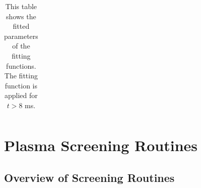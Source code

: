 \documentclass[
	11pt, %
]{beamer}
\begin{document}
\begin{frame}[allowframebreaks]
\begin{table}
{\begin{tabular}{ccccccc}
        \bottomrule
        \end{tabular}}
        \caption{\scriptsize This table shows the fitted parameters of the fitting functions. The fitting function is applied for $t > 8$ ms.}
    \end{table}

    \begin{table}
        \caption{This table shows the instantaneous flame propagation speed at $t = 23$ ms, $t = 100$ ms and $t = 120$ ms. $t = 23$ ms represents the acceleration for {\tt subch full} and {\tt subch simple}. $t = 100$ ms and $t = 120$ ms represent the steady phase at the late-stage.}
    \end{table}

\end{frame}


\section{Plasma Screening Routines}
\subsection{Overview of Screening Routines}
\end{document}
